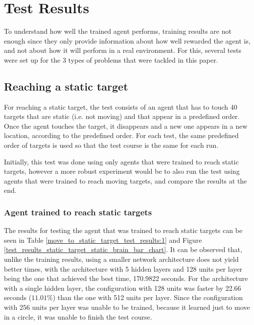 \chapter{Test Results}

To understand how well the trained agent performs, training results are not enough since they only provide information about how well rewarded the agent is, and not about how it will perform in a real environment. For this, several tests were set up for the 3 types of problems that were tackled in this paper.


\section{Reaching a static target} \label{test_reach_static_target}

For reaching a static target, the test consists of an agent that has to touch 40 targets that are static (i.e. not moving) and that appear in a predefined order. Once the agent touches the target, it disappears and a new one appears in a new location, according to the predefined order. For each test, the same predefined order of targets is used so that the test course is the same for each run. 

Initially, this test was done using only agents that were trained to reach static targets, however a more robust experiment would be to also run the test using agents that were trained to reach moving targets, and compare the results at the end.


\subsection{Agent trained to reach static targets}

The results for testing the agent that was trained to reach static targets can be seen in Table \ref{move_to_static_target_test_results:1} and Figure \ref{test_results_static_target_static_brain_bar_chart}. It can be observed that, unlike the training results, using a smaller network architecture does not yield better times, with the architecture with 5 hidden layers and 128 units per layer being the one that achieved the best time, 170.9822 seconds. For the architecture with a single hidden layer, the configuration with 128 units was faster by 22.66 seconds ($11.01\%$) than the one with 512 units per layer. Since the configuration with 256 units per layer was unable to be trained, because it learned just to move in a circle, it was unable to finish the test course.

